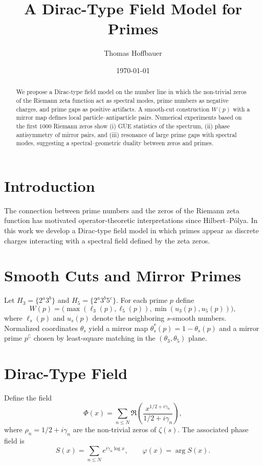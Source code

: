 \documentclass[11pt]{article}
\title{A Dirac-Type Field Model for Primes}
\author{Thomas Hoffbauer}
\date{\today}
\begin{document}
\maketitle

\begin{abstract}
We propose a Dirac-type field model on the number line in which the
non-trivial zeros of the Riemann zeta function act as spectral modes,
prime numbers as negative charges, and prime gaps as positive artifacts.
A smooth-cut construction $W(p)$ with a mirror map defines local
particle--antiparticle pairs. Numerical experiments based on the first
$1000$ Riemann zeros show (i) GUE statistics of the spectrum, (ii) phase
antisymmetry of mirror pairs, and (iii) resonance of large prime gaps
with spectral modes, suggesting a spectral--geometric duality between
zeros and primes.
\end{abstract}

\section{Introduction}
The connection between prime numbers and the zeros of the Riemann zeta
function has motivated operator-theoretic interpretations since
Hilbert--P\'olya. In this work we develop a Dirac-type field model in
which primes appear as discrete charges interacting with a spectral
field defined by the zeta zeros.

\section{Smooth Cuts and Mirror Primes}
Let $H_3=\{2^a3^b\}$ and $H_5=\{2^a3^b5^c\}$. For each prime $p$ define
\begin{equation}
W(p)=\big(\max(\ell_3(p),\ell_5(p)),\min(u_3(p),u_5(p))\big),
\end{equation}
where $\ell_s(p)$ and $u_s(p)$ denote the neighboring $s$-smooth numbers.
Normalized coordinates $\theta_s$ yield a mirror map
$\theta_s^*(p)=1-\theta_s(p)$ and a mirror prime $p^\complement$ chosen by
least-square matching in the $(\theta_3,\theta_5)$ plane.

\section{Dirac-Type Field}
Define the field
\begin{equation}
\Phi(x)=\sum_{n\le N}\Re\!\left(\frac{x^{1/2+i\gamma_n}}{1/2+i\gamma_n}\right),
\end{equation}
where $\rho_n=1/2+i\gamma_n$ are the non-trivial zeros of $\zeta(s)$. The
associated phase field is
\begin{equation}
S(x)=\sum_{n\le N} e^{i\gamma_n\log x},\qquad \varphi(x)=\arg S(x).
\end{equation}
\end{document}
